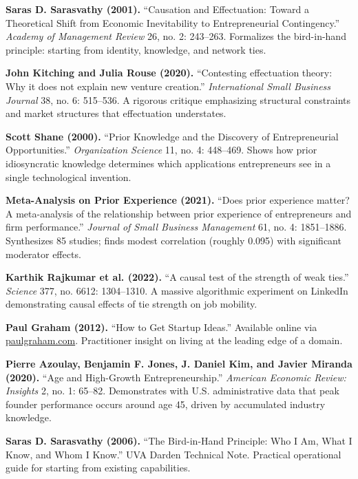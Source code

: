 \begin{enumerate}[label=\textbf{[\arabic*]},leftmargin=11pt,itemsep=2.5pt,topsep=1.5pt,parsep=0pt]
  \item \textbf{Saras D. Sarasvathy (2001).} ``Causation and Effectuation: Toward a Theoretical Shift from Economic Inevitability to Entrepreneurial Contingency.'' \textit{Academy of Management Review} 26, no. 2: 243--263. Formalizes the bird-in-hand principle: starting from identity, knowledge, and network ties.
  \item \textbf{John Kitching and Julia Rouse (2020).} ``Contesting effectuation theory: Why it does not explain new venture creation.'' \textit{International Small Business Journal} 38, no. 6: 515--536. A rigorous critique emphasizing structural constraints and market structures that effectuation understates.
  \item \textbf{Scott Shane (2000).} ``Prior Knowledge and the Discovery of Entrepreneurial Opportunities.'' \textit{Organization Science} 11, no. 4: 448--469. Shows how prior idiosyncratic knowledge determines which applications entrepreneurs see in a single technological invention.
  \item \textbf{Meta-Analysis on Prior Experience (2021).} ``Does prior experience matter? A meta-analysis of the relationship between prior experience of entrepreneurs and firm performance.'' \textit{Journal of Small Business Management} 61, no. 4: 1851--1886. Synthesizes 85 studies; finds modest correlation (roughly 0.095) with significant moderator effects.
  \item \textbf{Karthik Rajkumar et al. (2022).} ``A causal test of the strength of weak ties.'' \textit{Science} 377, no. 6612: 1304--1310. A massive algorithmic experiment on LinkedIn demonstrating causal effects of tie strength on job mobility.
  \item \textbf{Paul Graham (2012).} ``How to Get Startup Ideas.'' Available online via \href{https://www.paulgraham.com/startupideas.html}{\color{BayesTeal}paulgraham.com}. Practitioner insight on living at the leading edge of a domain.
  \item \textbf{Pierre Azoulay, Benjamin F. Jones, J. Daniel Kim, and Javier Miranda (2020).} ``Age and High-Growth Entrepreneurship.'' \textit{American Economic Review: Insights} 2, no. 1: 65--82. Demonstrates with U.S. administrative data that peak founder performance occurs around age 45, driven by accumulated industry knowledge.
  \item \textbf{Saras D. Sarasvathy (2006).} ``The Bird-in-Hand Principle: Who I Am, What I Know, and Whom I Know.'' UVA Darden Technical Note. Practical operational guide for starting from existing capabilities.
\end{enumerate}

